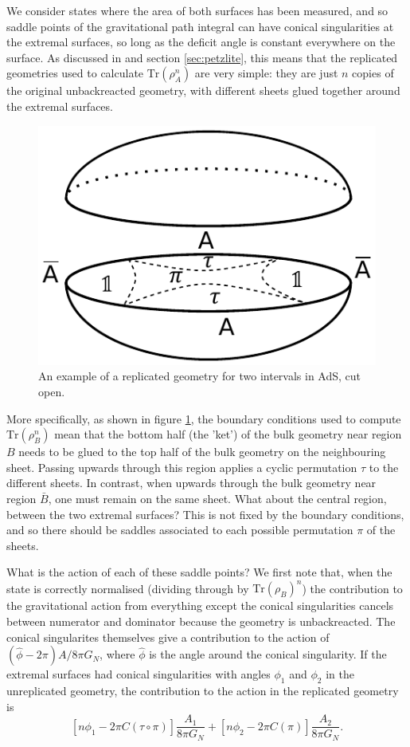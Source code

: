 \documentclass[11pt]{article}
\numberwithin{equation}{section}
\def\tr{\text{Tr}}
\begin{document}
We consider states where the area of both surfaces has been measured, and so saddle points of the gravitational path integral can have conical singularities at the extremal surfaces, so long as the deficit angle is constant everywhere on the surface. As discussed in \cite{Akers:2018fow,Dong:2018seb} and section \ref{sec:petzlite}, this means that the replicated geometries used to calculate $\tr(\rho_A^n)$ are very simple: they are just $n$ copies of the original unbackreacted geometry, with different sheets glued together around the extremal surfaces.
\begin{figure}[t]
\begin{center}
\includegraphics[width = .4\textwidth]{images/permutationRegions.pdf}
\caption{{\small An example of a replicated geometry for two intervals in AdS, cut open.}}\label{fig:twointerval}
\end{center}
\end{figure}

More specifically, as shown in figure \ref{fig:twointerval}, the boundary conditions used to compute $\tr(\rho_B^n)$ mean that the bottom half (the 'ket') of the bulk geometry near region $B$ needs to be glued to the top half of the bulk geometry on the neighbouring sheet. Passing upwards through this region applies a cyclic permutation $\tau$ to the different sheets. In contrast, when upwards through the bulk geometry near region $\bar B$, one must remain on the same sheet. What about the central region, between the two extremal surfaces? This is not fixed by the boundary conditions, and so there should be saddles associated to each possible permutation $\pi$ of the sheets.

What is the action of each of these saddle points? We first note that, when the state is correctly normalised (dividing through by $\tr(\rho_B)^n$) the contribution to the gravitational action from everything except the conical singularities cancels between numerator and dominator because the geometry is unbackreacted. The conical singularites themselves give a contribution to the action of $(\hat{\phi} - 2 \pi) A/8 \pi G_N$, where $\hat{\phi}$ is the angle around the conical singularity. If the extremal surfaces had conical singularities with angles $\phi_1$ and $\phi_2$ in the unreplicated geometry, the contribution to the action in the replicated geometry is
$$
\left[n \phi_1 - 2 \pi C(\tau \circ \pi)\right] \frac{A_1}{8 \pi G_N} + \left[n \phi_2 - 2 \pi C(\pi)\right] \frac{A_2}{8 \pi G_N}.
$$
\end{document}
